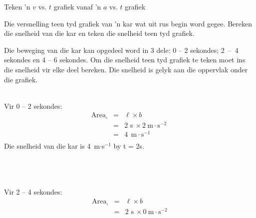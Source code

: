 \begin{wex}{Teken 'n $v$ vs. $t$ grafiek vanaf 'n $a$ vs. $t$ grafiek}
{Die versnelling teen tyd grafiek van 'n kar wat uit rus begin word gegee. Bereken die snelheid van die kar en teken die snelheid teen tyd grafiek.
\begin{center}
\end{center}}
{
Die beweging van die kar kan opgedeel word in 3 dele: 0 -- 2 sekondes; 2~--~4 sekondes en 4 -- 6 sekondes. Om die snelheid teen tyd grafiek te teken moet ins die snelheid vir elke deel bereken. Die snelheid is gelyk aan die oppervlak onder die grafiek.\\
\\
\begin{minipage}{0.3\textwidth}
Vir 0 -- 2 sekondes:
\begin{eqnarray*}
\text{Area}_{\square} &=& \ell \times b\\
&=& 2\text{~s}\ \times 2~\text{m}\cdot \text{s}^{-2}\ \\
&=&4\ ~\text{m}\cdot \text{s}^{-1}\\
\end{eqnarray*}
Die snelheid van die kar is 4~m$\cdot$s$^{-1}$ by t = 2s.\\
\\
\\
\\
\end{minipage}
\begin{minipage}{0.03\textwidth}
\begin{center}
\end{center}
\end{minipage}
\begin{minipage}{0.3\textwidth}
Vir 2 -- 4 sekondes:
\begin{eqnarray*}
\text{Area}_{\square} &=& \ell \times b\\
&=& 2\text{~s}\ \times 0~\text{m}\cdot \text{s}^{-2}\\

\end{eqnarray*}
\end{minipage}}
\end{wex}
